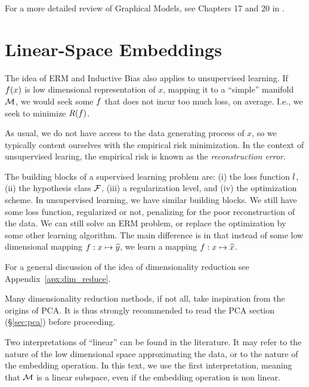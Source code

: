 For a more detailed review of Graphical Models, see Chapters 17 and 20 in \cite{wasserman_all_2004}. 















\section{Linear-Space Embeddings}
\label{sec:dim_reduce_linear}


The idea of ERM and Inductive Bias also applies to unsupervised learning.
If $f(x)$ is low dimensional representation of $x$, mapping it to a ``simple'' manifold $\mathcal{M}$, we would seek some $f$ that does not incur too much loss, on average. I.e., we seek to minimize $R(f)$.

As usual, we do not have access to the data generating process of $x$, so we typically content ourselves with the empirical risk minimization.
In the context of unsupervised learing, the empirical risk is known as the \emph{reconstruction error}.

The building blocks of a supervised learning problem are: 
(i) the loss function $l$,
(ii) the hypothesis class $\mathcal{F}$, 
(iii) a regularization level, and
(iv) the optimization scheme.
In unsupervised learning, we have similar building blocks. We still have some loss function, regularized or not, penalizing for the poor reconstruction of the data. We can still solve an ERM problem, or replace the optimization by some other learning algorithm. The main difference is in that instead of some low dimensional mapping $f:x \mapsto \widehat{y}$, we learn a mapping  $f:x \mapsto \widehat{x}$.


For a general discussion of the idea of dimensionality reduction see Appendix~\ref{apx:dim_reduce}.

Many dimensionality reduction methods, if not all, take inspiration from the origins of PCA. It is thus strongly recommended to read the PCA section (\S\ref{sec:pca}) before proceeding.

\begin{remark}
\label{remark:linear}
	Two interpretations of ``linear'' can be found in the literature. It may refer to the nature of the low dimensional space approximating the data, or to the nature of the embedding operation. In this text, we use the first interpretation, meaning that $\mathcal{M}$ is a linear subspace, even if the embedding operation is non linear.
\end{remark}


